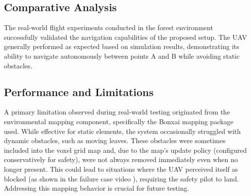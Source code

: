         \subsection{Comparative Analysis}
            The real-world flight experiments conducted in the forest environment successfully validated the navigation capabilities of the proposed setup.
            The \ac{UAV} generally performed as expected based on simulation results, demonstrating its ability to navigate autonomously between points A and B while avoiding static obstacles.

            \subsection{Performance and Limitations}
                A primary limitation observed during real-world testing originated from the environmental mapping component, specifically the Bonxai mapping package used.
                While effective for static elements, the system occasionally struggled with dynamic obstacles, such as moving leaves.
                These obstacles were sometimes included into the voxel grid map and, due to the map's update policy (configured conservatively for safety), were not always removed immediately even when no longer present. 
                This could lead to situations where the \ac{UAV} perceived itself as blocked (as shown in the failure case video \cite{flight_fail}), requiring the safety pilot to land. 
                Addressing this mapping behavior is crucial for future testing.

